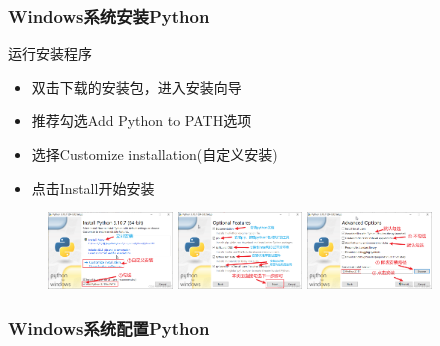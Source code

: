 \begin{frame}
	\frametitle{\textrm{Windows}系统安装\textrm{Python}}
        运行安装程序
            \begin{itemize}
                \item 双击下载的安装包，进入安装向导
		\item 推荐勾选\textrm{Add Python to PATH}选项\\
			{\fontsize{7.2pt}{4.2pt}}
		\item 选择\textrm{Customize installation}(自定义安装)\\
		{\fontsize{7.2pt}{4.2pt}}
		\item 点击\textrm{Install}开始安装
            \end{itemize}
\begin{figure}[h!]
\centering
\includegraphics[height=0.8in, width=1.3in, viewport=0 0 666 410,clip]{Figures/python_install-windows-1.png}
\includegraphics[height=0.8in, width=1.3in, viewport=0 0 666 410,clip]{Figures/python_install-windows-2.png}
\includegraphics[height=0.8in, width=1.3in, viewport=0 0 666 410,clip]{Figures/python_install-windows-3.png}
\label{Python-download_windows}
\end{figure}
\end{frame}

\begin{frame}
	\frametitle{\textrm{Windows}系统配置\textrm{Python}}
\end{frame}

